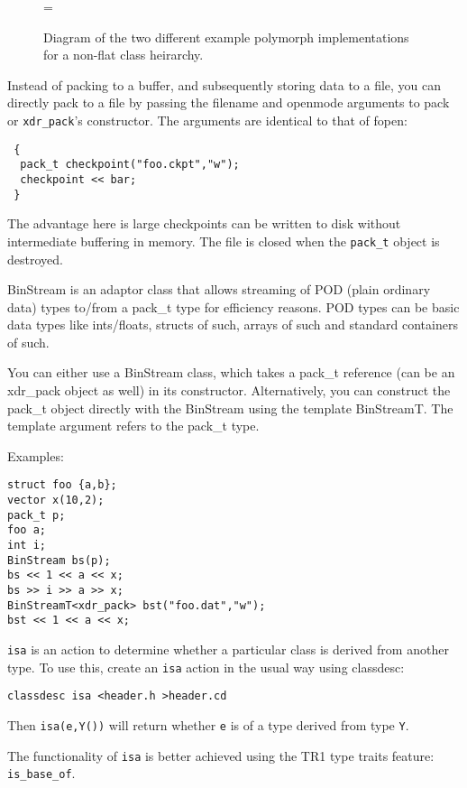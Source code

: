 \begin{figure}
\epsfclipon\epsfxsize=\textwidth
{}
\caption{Diagram of the two different example polymorph
  implementations for a non-flat class heirarchy.}
\label{polymorph-example}
\end{figure}


Instead of packing to a buffer, and subsequently storing data to a
file, you can directly pack to a file by passing the filename and
openmode arguments to pack or \verb+xdr_pack+'s constructor. The arguments
are identical to that of fopen:
\begin{verbatim}
 {
  pack_t checkpoint("foo.ckpt","w");
  checkpoint << bar;
 } 
\end{verbatim}
The advantage here is large checkpoints can be written to disk without
intermediate buffering in memory. The file is closed when the \verb+pack_t+
object is destroyed.


BinStream is an adaptor class that allows streaming of POD (plain
ordinary data) types to/from a pack\_t type for efficiency reasons. POD
types can be basic data types like ints/floats, structs of such,
arrays of such and standard containers of such.

You can either use a BinStream class, which takes a pack\_t reference
(can be an xdr\_pack object as well) in its constructor. Alternatively,
you can construct the pack\_t object directly with the BinStream using
the template BinStreamT. The template argument refers to the pack\_t type.

Examples:
\begin{verbatim}
struct foo {a,b};
vector x(10,2);
pack_t p;
foo a; 
int i;
BinStream bs(p);
bs << 1 << a << x;
bs >> i >> a >> x;
BinStreamT<xdr_pack> bst("foo.dat","w");
bst << 1 << a << x;
\end{verbatim}

\verb+isa+ is an action to determine whether a particular class is
derived from another type. To use this, create an \verb+isa+ action in
the usual way using classdesc:
\begin{verbatim}
classdesc isa <header.h >header.cd
\end{verbatim}
Then \verb+isa(e,Y())+ will return whether \verb+e+ is of a type
derived from type \verb+Y+.

The functionality of \verb+isa+ is better achieved using the TR1 type
traits feature: \verb+is_base_of+.

